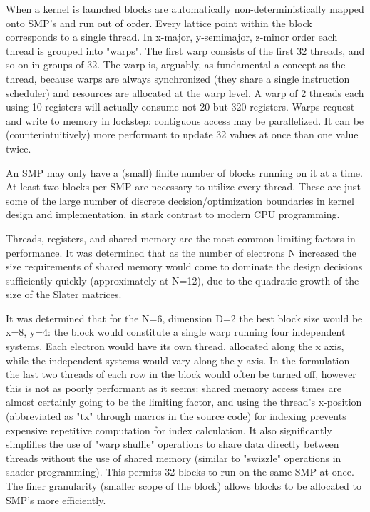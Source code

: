 \documentclass[11pt, conference, compsocconf]{IEEEtran}
\begin{document}
When a kernel is launched blocks are automatically non-deterministically mapped onto SMP's and run out of order. Every lattice point within the block corresponds to a single thread. In x-major, y-semimajor, z-minor order each thread is grouped into "warps". The first warp consists of the first 32 threads, and so on in groups of 32. The warp is, arguably, as fundamental a concept as the thread, because warps are always synchronized (they share a single instruction scheduler) and resources are allocated at the warp level. A warp of 2 threads each using 10 registers will actually consume not 20 but 320 registers. Warps request and write to memory in lockstep: contiguous access may be parallelized. It can be (counterintuitively) more performant to update 32 values at once than one value twice. 

An SMP may only have a (small) finite number of blocks running on it at a time. At least two blocks per SMP are necessary to utilize every thread. These are just some of the large number of discrete decision/optimization boundaries in kernel design and implementation, in stark contrast to modern CPU programming. 

Threads, registers, and shared memory are the most common limiting factors in performance. It was determined that as the number of electrons N increased the size requirements of shared memory would come to dominate the design decisions sufficiently quickly (approximately at N=12), due to the quadratic growth of the size of the Slater matrices. 

It was determined that for the N=6, dimension D=2 the best block size would be x=8, y=4: the block would constitute a single warp running four independent systems. Each electron would have its own thread, allocated along the x axis, while the independent systems would vary along the y axis. In the formulation the last two threads of each row in the block would often be turned off, however this is not as poorly performant as it seems: shared memory access times are almost certainly going to be the limiting factor, and using the thread's x-position (abbreviated as "tx" through macros in the source code) for indexing prevents expensive repetitive computation for index calculation. It also significantly simplifies the use of "warp shuffle" operations to share data directly between threads without the use of shared memory (similar to "swizzle" operations in shader programming). This permits 32 blocks to run on the same SMP at once. The finer granularity (smaller scope of the block) allows blocks to be allocated to SMP's more efficiently.
\end{document}
